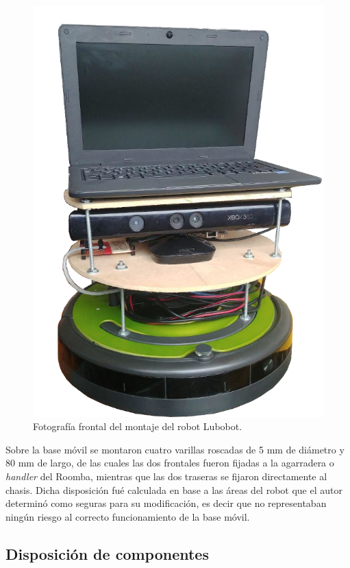 \begin{figure}[ht]
  \centering
  \includegraphics[scale=0.5]{./Figures/lubobot.png}
  \caption{Fotografía frontal del montaje del robot Lubobot.}
  \label{fig:lubobotReal}
\end{figure}

\newpage

Sobre la base móvil se montaron cuatro varillas roscadas de 5 mm de diámetro y 80 mm de largo, de las cuales las dos frontales fueron fijadas a la agarradera o  \textit{handler} del Roomba, mientras que las dos traseras se fijaron directamente al chasis. Dicha disposición fué calculada en base a las áreas del robot que el autor determinó como seguras para su modificación, es decir que no representaban ningún riesgo al correcto funcionamiento de la base móvil.

\subsection{Disposición de componentes}

